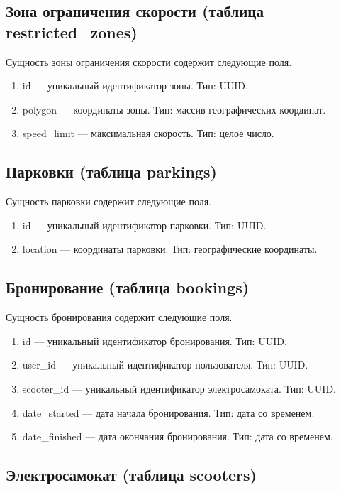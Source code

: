 \subsection{Зона ограничения скорости (таблица restricted\_zones)}

Сущность зоны ограничения скорости содержит следующие поля.

\begin{enumerate}
	\item id --- уникальный идентификатор зоны. Тип: UUID.
	\item polygon --- координаты зоны. Тип: массив географических координат.
	\item speed\_limit --- максимальная скорость. Тип: целое число.
\end{enumerate}

\subsection{Парковки (таблица parkings)}

Сущность парковки содержит следующие поля.

\begin{enumerate}
	\item id --- уникальный идентификатор парковки. Тип: UUID.
	\item location --- координаты парковки. Тип: географические координаты.
\end{enumerate}

\subsection{Бронирование (таблица bookings)}

Сущность бронирования содержит следующие поля.

\begin{enumerate}
	\item id --- уникальный идентификатор бронирования. Тип: UUID.
	\item user\_id --- уникальный идентификатор пользователя. Тип: UUID.
	\item scooter\_id --- уникальный идентификатор электросамоката. Тип: UUID.
	\item date\_started --- дата начала бронирования. Тип: дата со временем.
	\item date\_finished --- дата окончания бронирования. Тип: дата со временем.
\end{enumerate}

\subsection{Электросамокат (таблица scooters)}

